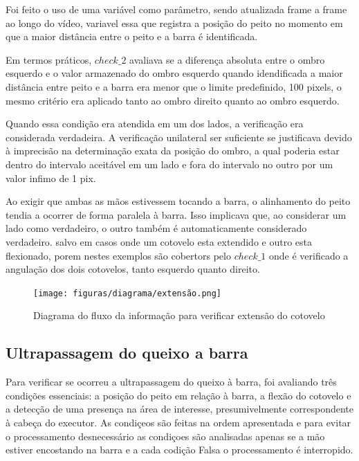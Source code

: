 Foi feito o uso de uma variável como parâmetro, sendo atualizada frame a frame ao longo do vídeo, variavel essa que registra a posição do peito no momento em que a maior distância entre o peito e a barra é identificada.

Em termos práticos, $check\_2$ avaliava se a diferença absoluta entre o ombro esquerdo e o valor armazenado do ombro esquerdo quando idendificada a maior distância entre peito e a barra era menor que o limite predefinido, 100 pixels, o mesmo critério era aplicado tanto ao ombro direito quanto ao ombro esquerdo. 

Quando essa condição era atendida em um dos lados, a verificação era considerada verdadeira. A verificação unilateral ser suficiente se justificava devido à imprecisão na determinação exata da posição do ombro, a qual poderia estar dentro do intervalo aceitável em um lado e fora do intervalo no outro por um valor infimo de 1 pix.

Ao exigir que ambas as mãos estivessem tocando a barra, o alinhamento do peito tendia a ocorrer de forma paralela à barra. Isso implicava que, ao considerar um lado como verdadeiro, o outro também é automaticamente considerado verdadeiro. salvo em casos onde um cotovelo esta extendido e outro esta flexionado, porem  nestes exemplos são cobertors pelo $check\_1$ onde é verificado a angulação dos dois cotovelos, tanto esquerdo quanto direito.


\begin{figure}[H]
	\centering
    \caption{Diagrama do fluxo da informação para verificar extensão do cotovelo}
	\texttt{[image: figuras/diagrama/extensão.png]}
	\label{dia:extensao}
\end{figure}





\subsection[Ultrapassagem do queixo a barra]{Ultrapassagem do queixo a barra}\label{sec:meta}

Para verificar se ocorreu a ultrapassagem do queixo à barra, foi avaliando três condições essenciais: a posição do peito em relação à barra, a flexão do cotovelo e a detecção de uma presença na área de interesse, presumivelmente correspondente à cabeça do executor. As condiçeos são feitas na ordem apresentada e para evitar o processamento desnecessário as condiçoes são analisadas apenas se a mão estiver encostando na barra e a cada codição Falsa o processamento é interropido.


